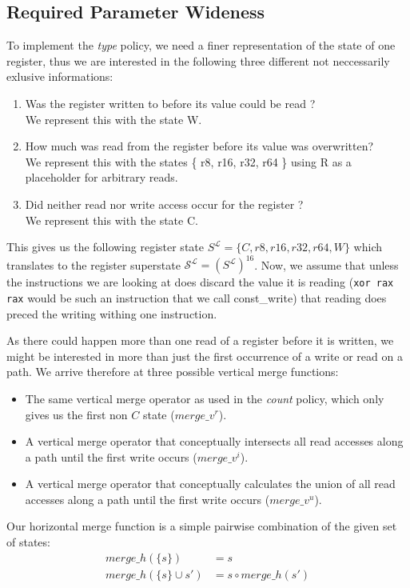 \subsection{Required Parameter Wideness}
\label{subsection:requiredparamwideness}
To implement the \emph{type} policy, we need a finer representation of the state of one register, thus we are interested in the following three different not neccessarily exlusive informations:
\begin{enumerate}
\item Was the register written to before its value could be read ? \\ We represent this with the state W.
\item How much was read from the register before its value was overwritten? \\ We represent this with the states \{ r8, r16, r32, r64 \} using R as a placeholder for arbitrary reads.
\item Did neither read nor write access occur for the register ? \\ We represent this with the state C.
\end{enumerate}
This gives us the following register state $S^\mathcal{L} = \{ C, r8, r16, r32, r64, W \}$ which translates to the register superstate $\mathcal{S}^\mathcal{L} = (S^\mathcal{L})^{16}$.
Now, we assume that unless the instructions we are looking at does discard the value it is reading (\texttt{xor rax rax} would be such an instruction that we call const\_write) that reading does preced the writing withing one instruction.

As there could happen more than one read of a register before it is written, we might be interested in more than just the first occurrence of a write or read on a path. We arrive therefore at three possible vertical merge functions:
\begin{itemize}
	\item The same vertical merge operator as used in the \emph{count} policy, which only gives us the first non $C$ state ($merge\_v^{r}$).
	\item A vertical merge operator that conceptually intersects all read accesses along a path until the first write occurs ($merge\_v^{i}$).
	\item A vertical merge operator that conceptually calculates the union of all read accesses along a path until the first write occurs ($merge\_v^{u}$).
\end{itemize}

Our horizontal merge function is a simple pairwise combination of the given set of states:
\begin{align}
merge\_h(\{s\}) &= s\\
merge\_h(\{s\} \cup s') &= s \circ merge\_h(s')
\end{align}

